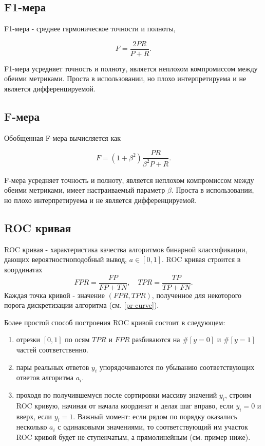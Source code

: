 \subsection{F1-мера}

F1-мера - среднее гармоническое точности и полноты,

$$
F = \frac{2PR}{P + R}.
$$

F1-мера усредняет точность и полноту, является неплохом компромиссом между обеими метриками. Проста в использовании, но плохо интерпретируема и не является дифференцируемой.

\subsection{F-мера}

Обобщенная F-мера вычисляется как

$$
F = (1+\beta^2)\frac{PR}{\beta^2P + R}.
$$

F-мера усредняет точность и полноту, является неплохом компромиссом между обеими метриками, имеет настраиваемый параметр $\beta$. Проста в использовании, но плохо интерпретируема и не является дифференцируемой.

\subsection{ROC кривая}\label{roc-curve}

ROC кривая - характеристика качества алгоритмов бинарной классификации, дающих вероятностноподобный вывод, $a\in[0, 1]$. 
ROC кривая строится в координатах 
$$
FPR = \frac{FP}{FP + TN}, \quad TPR = \frac{TP}{TP + FN}.
$$
Каждая точка кривой - значение $(FPR, TPR)$, полученное для некоторого порога дискретизации алгоритма (см. \ref{pr-curve}). 

Более простой способ построения ROC кривой состоит в следующем:
\begin{enumerate}
    \item отрезки $[0, 1]$ по осям $TPR$ и $FPR$ разбиваются на $\#[y=0]$ и $\#[y=1]$ частей соответственно.
    \item пары реальных ответов $y_i$ упорядочиваются по убыванию соответствующих ответов алгоритма $a_i$.
    \item проходя по получившемуся после сортировки массиву значений $y_i$, строим ROC кривую, начиная от начала координат и делая шаг вправо, если $y_i=0$ и вверх, если $y_i=1$. Важный момент: если рядом по порядку оказались несколько $a_i$ с одинаковыми значениями, то соответствующий им участок ROC кривой будет не ступенчатым, а прямолинейным (см. пример ниже).
\end{enumerate}

